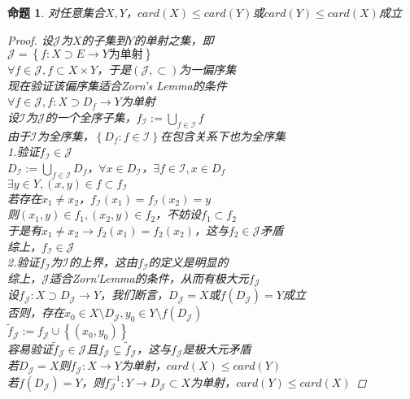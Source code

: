 \documentclass[12pt, a4paper, oneside]{ctexbook}
\newtheorem{proposition}[theorem]{命题}
\begin{document}
\begin{proposition}
    对任意集合$X,Y$，$card(X)\leq card(Y)$或$card(Y)\leq card(X)$成立
    \begin{proof}
        设$\mathcal{J}$为$X$的子集到$Y$的单射之集，即\\
        $\mathcal{J}=\left\{f:X\supset E\rightarrow Y\text{为单射}\right\}$\\
        $\forall f\in\mathcal{J},f\subset X\times Y$，于是$(\mathcal{J},\subset)$为一偏序集\\
        现在验证该偏序集适合Zorn's Lemma的条件\\
        $\forall f\in \mathcal{J},f:X\supset D_{f}\rightarrow Y$为单射\\
        设$\mathcal{I}$为$\mathcal{J}$的一个全序子集，$f_{\mathcal{I}}:=\bigcup_{f\in\mathcal{I}}f$\\
        由于$\mathcal{I}$为全序集，$\left\{D_f:f\in\mathcal{I}\right\}$在包含关系下也为全序集\\
        1.验证$f_{\mathcal{I}}\in\mathcal{J}$\\
        $D_{\mathcal{I}}:=\bigcup_{f\in\mathcal{I}}D_f$，$\forall x\in D_{\mathcal{I}}$，$\exists f\in\mathcal{I},x\in D_f$\\
        $\exists y\in Y,(x,y)\in f\subset f_{\mathcal{I}}$\\
        若存在$x_1\neq  x_2$，$f_{\mathcal{I}}(x_1)=f_{\mathcal{I}}(x_2)=y$\\
        则$(x_1,y)\in f_1,(x_2,y)\in f_2$，不妨设$f_1\subset f_2$\\
        于是有$x_1\neq x_2\rightarrow f_2(x_1)=f_2(x_2)$，这与$f_2\in\mathcal{J}$矛盾\\
        综上，$f_{\mathcal{I}}\in\mathcal{J}$\\
        2.验证$f_{\mathcal{I}}$为$\mathcal{I}$的上界，这由$f_{\mathcal{I}}$的定义是明显的\\
        综上，$\mathcal{J}$适合Zorn'Lemma的条件，从而有极大元$f_{\mathcal{J}}$\\
        设$f_{\mathcal{J}}:X\supset D_{\mathcal{J}}\rightarrow Y$，我们断言，$D_{\mathcal{J}}=X$或$f(D_{\mathcal{J}})=Y$成立\\
        否则，存在$x_0\in X\setminus D_{\mathcal{J}},y_0\in Y\setminus f(D_{\mathcal{J}})$\\
        $\tilde{f}_{\mathcal{J}}:=f_{\mathcal{J}}\cup\left\{(x_0,y_0)\right\}$\\
        容易验证$\tilde{f}_{\mathcal{J}}\in\mathcal{J}$且$f_{\mathcal{J}}\subsetneq \tilde{f}_{\mathcal{J}}$，这与$f_{\mathcal{J}}$是极大元矛盾\\
        若$D_{\mathcal{J}}=X$则$f_{\mathcal{J}}:X\rightarrow Y$为单射，$card(X)\leq card(Y)$\\
        若$f(D_{\mathcal{J}})=Y$，则$f_{\mathcal{J}}^{-1}:Y\rightarrow D_{\mathcal{J}}\subset X$为单射，$card(Y)\leq card(X)$
    \end{proof}
\end{proposition}
\end{document}
